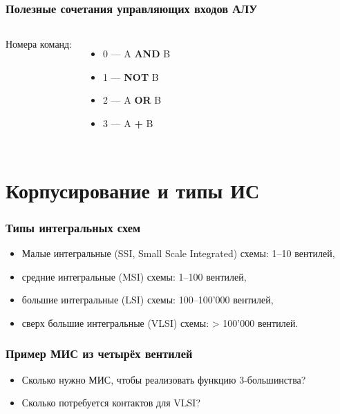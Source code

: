 \begin{frame}
\frametitle{Полезные сочетания управляющих входов АЛУ}
\begin{columns}

        \column{3.5cm}
    Номера команд:
    \begin{itemize}
        \item 0 — A \textbf{AND} B
        \item 1 — \textbf{NOT} B
        \item 2 — A \textbf{OR} B
        \item 3 — A \textbf{+} B
    \end{itemize}

        \column{9cm}
    \vspace{-.3cm}
\end{columns}
\end{frame}



\section{Корпусирование и типы ИС}

\begin{frame}
\frametitle{Типы интегральных схем}
\vspace{-.3cm}\pause\begin{itemize}
    \item Малые  интегральные (SSI, Small Scale Integrated) схемы: 1–10 вентилей,
    \item средние интегральные (MSI) схемы: 1–100 вентилей,
    \item большие интегральные (LSI) схемы: 100–100'000 вентилей,
    \item сверх большие интегральные (VLSI) схемы: > 100'000 вентилей.
\end{itemize}
\end{frame}


\begin{frame}
\frametitle{Пример МИС из четырёх вентилей}
\pause\begin{itemize}
    \item \small Сколько нужно МИС, чтобы реализовать функцию 3-большинства?
    \item \small Сколько потребуется контактов для VLSI?
\end{itemize}
\end{frame}

